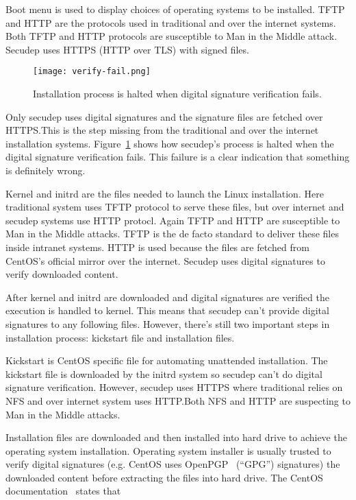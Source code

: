 Boot menu is used to display choices of operating systems to be
installed. TFTP and HTTP are the protocols used in traditional and
over the internet systems. Both TFTP and HTTP protocols are
susceptible to Man in the Middle attack. Secudep uses HTTPS (HTTP over
TLS) with signed files.

\begin{figure}[h]
  \texttt{[image: verify-fail.png]}
  \caption{Installation process is halted when digital signature
    verification fails.\label{fig:verify-fail}}
\end{figure}

Only secudep uses digital signatures and the signature files are
fetched over HTTPS.\@ This is the step missing from the traditional and
over the internet installation systems. Figure~\ref{fig:verify-fail}
shows how secudep's process is halted when the digital signature
verification fails. This failure is a clear indication that something
is definitely wrong.

Kernel and initrd are the files needed to launch the Linux
installation. Here traditional system uses TFTP protocol to serve
these files, but over internet and secudep systems use HTTP
protocl. Again TFTP and HTTP are susceptible to Man in the Middle
attacks. TFTP is the de facto standard to deliver these files inside
intranet systems. HTTP is used because the files are fetched from
CentOS's official mirror over the internet. Secudep uses digital
signatures to verify downloaded content.

After kernel and initrd are downloaded and digital signatures are
verified the execution is handled to kernel. This means that secudep
can't provide digital signatures to any following files. However, there's
still two important steps in installation process: kickstart file and
installation files.

Kickstart is CentOS specific file for automating unattended
installation. The kickstart file is downloaded by the initrd system so
secudep can't do digital signature verification. However, secudep uses
HTTPS where traditional relies on NFS and over internet system uses
HTTP.\@ Both NFS and HTTP are suspecting to Man in the Middle attacks.

Installation files are downloaded and then installed into hard drive
to achieve the operating system installation. Operating system
installer is usually trusted to verify digital signatures (e.g. CentOS
uses OpenPGP~\cite{RFC4880} (``GPG'') signatures) the downloaded
content before extracting the files into hard drive. The CentOS
documentation~\cite{centos-gpg} states that

